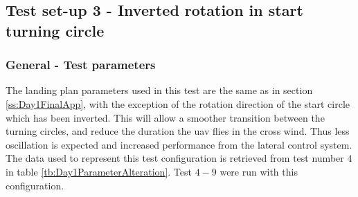 \subsection{Test set-up 3 - Inverted rotation in start turning circle}\label{ss:Day1Inverted}
\subsubsection{General - Test parameters}
The landing plan parameters used in this test are the same as in section \ref{ss:Day1FinalApp}, with the exception of the rotation direction of the start circle which has been inverted. This will allow a smoother transition between the turning circles, and reduce the duration the \gls{uav} flies in the cross wind. Thus less oscillation is expected and increased performance from the lateral control system. The data used to represent this test configuration is retrieved from test number $4$ in table \ref{tb:Day1ParameterAlteration}. Test $4-9$ were run with this configuration.

